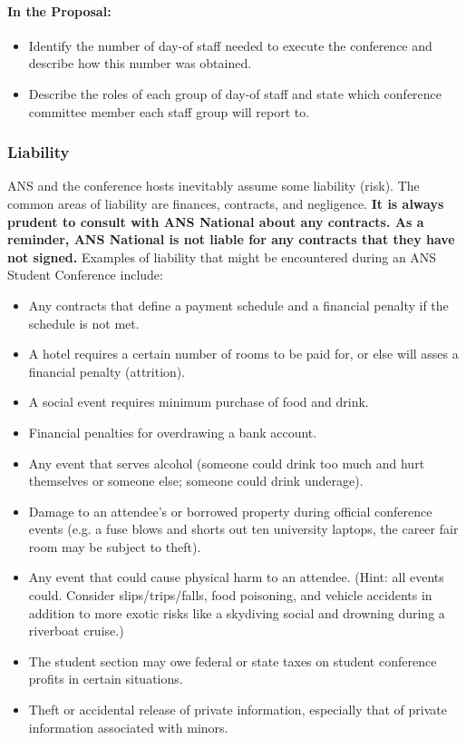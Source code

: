 \documentclass[12pt]{article}
\begin{document}
\paragraph{In the Proposal:}
\begin{itemize}
\item{Identify the number of day-of staff needed to execute the conference and describe
how this number was obtained.}
\item{Describe the roles of each group of day-of staff and state which conference
committee member each staff group will report to.}
\end{itemize}

\subsubsection{Liability}\label{sec:liability}
ANS and the conference hosts inevitably assume some liability (risk). The common
areas of liability are finances, contracts, and negligence. 
\textbf{It is always prudent to consult with ANS National about any contracts. As a reminder, ANS National is not liable for any contracts that they have not signed.}
Examples of liability that might be encountered during an ANS Student Conference include:


\begin{itemize}
\item{Any contracts that define a payment schedule and a financial penalty if the schedule is not met.}
\item{A hotel requires a certain number of rooms to be paid for, or else will asses a financial penalty (attrition).}
\item{A social event requires minimum purchase of food and drink.}
\item{Financial penalties for overdrawing a bank account.}
\item{Any event that serves alcohol (someone could drink
too much and hurt themselves or someone else; someone could drink underage).}
\item{Damage to an attendee's or borrowed property during official conference events (e.g. a fuse blows and shorts out ten university laptops, the career fair room may be subject to theft).}
\item{Any event that could cause physical harm to an attendee. (Hint: all events could. Consider slips/trips/falls, food  poisoning, and vehicle accidents in addition to more exotic risks like a skydiving social and drowning during a riverboat cruise.)}
\item{The student section may owe federal or state taxes on student conference profits in certain situations.}
\item{Theft or accidental release of private information, especially that of private information associated with minors.}
\end{itemize}
\end{document}
